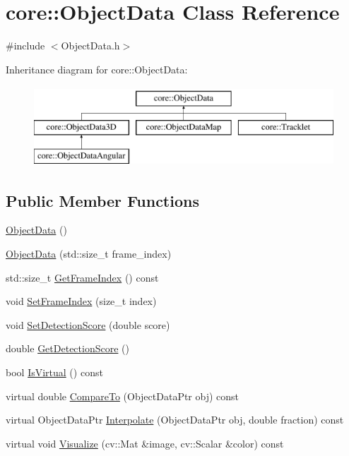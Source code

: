 \hypertarget{classcore_1_1ObjectData}{}\section{core\+:\+:Object\+Data Class Reference}
\label{classcore_1_1ObjectData}


{\ttfamily \#include $<$Object\+Data.\+h$>$}

Inheritance diagram for core\+:\+:Object\+Data\+:\begin{figure}[H]
\begin{center}
\leavevmode
\includegraphics[height=3.000000cm]{classcore_1_1ObjectData}
\end{center}
\end{figure}
\subsection*{Public Member Functions}
\begin{DoxyCompactItemize}
\item 
\hyperlink{classcore_1_1ObjectData_a7f47a396a3b9e8c12a1557c8156b8ff9}{Object\+Data} ()
\item 
\hyperlink{classcore_1_1ObjectData_af4333a52b012841a6ba73b25aeaae71b}{Object\+Data} (std\+::size\+\_\+t frame\+\_\+index)
\item 
std\+::size\+\_\+t \hyperlink{classcore_1_1ObjectData_a1151e9215baf315f4b98f696f4271162}{Get\+Frame\+Index} () const
\item 
void \hyperlink{classcore_1_1ObjectData_aedfe00fa37d5ac7ef554bda746931148}{Set\+Frame\+Index} (size\+\_\+t index)
\item 
void \hyperlink{classcore_1_1ObjectData_a737216c2689aefa216c1c842922d7dd8}{Set\+Detection\+Score} (double score)
\item 
double \hyperlink{classcore_1_1ObjectData_ae9208bfeee72238e2d635dfab368c09a}{Get\+Detection\+Score} ()
\item 
bool \hyperlink{classcore_1_1ObjectData_a2880d710cfa520e9c0453e2a6729c0e2}{Is\+Virtual} () const
\item 
virtual double \hyperlink{classcore_1_1ObjectData_afbf7a1e87235f1b204d4d2eb8a37a9a6}{Compare\+To} (Object\+Data\+Ptr obj) const
\item 
virtual Object\+Data\+Ptr \hyperlink{classcore_1_1ObjectData_ad681915317decab76c384a635fc8444e}{Interpolate} (Object\+Data\+Ptr obj, double fraction) const
\item 
virtual void \hyperlink{classcore_1_1ObjectData_aae2c4fceddc529570dbe8909309f9961}{Visualize} (cv\+::\+Mat \&image, cv\+::\+Scalar \&color) const
\end{DoxyCompactItemize}
